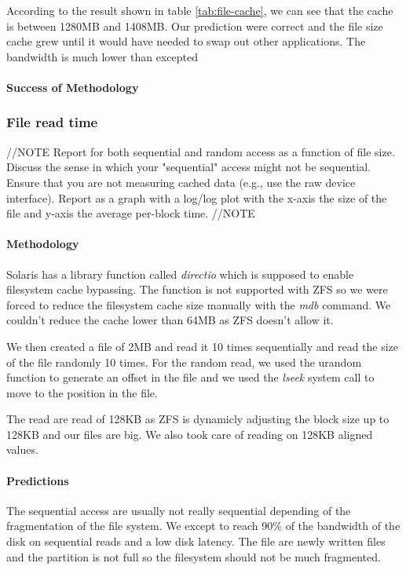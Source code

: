 According to the result shown in table \ref{tab:file-cache}, we can see that the cache
is between 1280MB and 1408MB.
Our prediction were correct and the file size cache grew until it would have
needed to swap out other applications.
The bandwidth is much lower than excepted

\paragraph{Success of Methodology}



\subsubsection{File read time}

//NOTE
Report for both sequential and random access as a function of file size. Discuss the sense in which your "sequential" access might not be sequential. Ensure that you are not measuring cached data (e.g., use the raw device interface). Report as a graph with a log/log plot with the x-axis the size of the file and y-axis the average per-block time.
//NOTE

\paragraph{Methodology}
Solaris has a library function called \emph{directio} which is supposed to
enable filesystem cache bypassing.
The function is not supported with ZFS so we were forced to reduce the
filesystem cache size manually with the \emph{mdb} command\cite{zfs-evil-tuning}.
We couldn't reduce the cache lower than 64MB as ZFS doesn't allow
it\cite{zfs-arc-max}.

We then created a file of 2MB and read it 10 times sequentially and read the
size of the file randomly 10 times.
For the random read, we used the urandom function to generate an offset in the
file and we used the \emph{lseek} system call to move to the position in the file.

The read are read of 128KB as ZFS is dynamicly adjusting the block size up to
128KB and our files are big.
We also took care of reading on 128KB aligned values.

\paragraph{Predictions}
The sequential access are usually not really sequential depending of the
fragmentation of the file system.
We except to reach 90\% of the bandwidth of the disk on sequential reads
and a low disk latency.
The file are newly written files and the partition is not full so the filesystem
should not be much fragmented.

